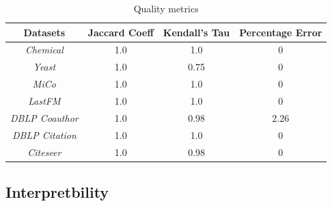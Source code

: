 \begin{table}[tb!]
	\vspace{-2mm}
	\begin{center}
		\vspace{-1mm}
		\centering
		\caption{Quality metrics\label{tab:quality}}
		\vspace{-3mm}
		\begin{tabular} {cccc}
			\hline
			Datasets  & Jaccard Coeff & Kendall's Tau  & Percentage Error\\			 
			\hline 
			{\em Chemical}   &   1.0   &  1.0   & 0\\
			{\em Yeast}   &   1.0    &  0.75  & 0\\
			{\em MiCo}   &   1.0    &  1.0   & 0\\ 
			{\em LastFM}   &  1.0   &  1.0 & 0\\
			{\em DBLP Coauthor}   &   1.0  &  0.98  & 2.26\\ 
			{\em DBLP Citation}   &   1.0   &  1.0   & 0\\
			{\em Citeseer}   &   1.0   &  0.98 & 0\\
			
			\hline
		\end{tabular}
	\end{center}
	\vspace{-4mm}
\end{table}

\subsection{Interpretbility}






